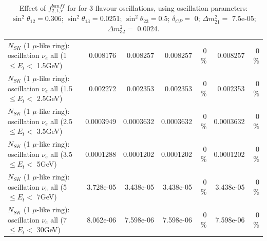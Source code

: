 \begin{table}
\begin{tabular}{| l | r | r | r  r | r  r |}
$N_{SK}$ (1 $\mu$-like ring): oscillation $\nu_{e}$ all (1 $\leq E_{t} <$ 1.5GeV) &        0.008176 &        0.008257 &        0.008257 &        0 \%  &        0.008257 &        0 \%  \\ 
$N_{SK}$ (1 $\mu$-like ring): oscillation $\nu_{e}$ all (1.5 $\leq E_{t} <$ 2.5GeV) &        0.002272 &        0.002353 &        0.002353 &        0 \%  &        0.002353 &        0 \%  \\ 
$N_{SK}$ (1 $\mu$-like ring): oscillation $\nu_{e}$ all (2.5 $\leq E_{t} <$ 3.5GeV) &       0.0003949 &       0.0003632 &       0.0003632 &        0 \%  &       0.0003632 &        0 \%  \\ 
$N_{SK}$ (1 $\mu$-like ring): oscillation $\nu_{e}$ all (3.5 $\leq E_{t} <$ 5GeV) &       0.0001288 &       0.0001202 &       0.0001202 &        0 \%  &       0.0001202 &        0 \%  \\ 
 $N_{SK}$ (1 $\mu$-like ring): oscillation $\nu_{e}$ all (5 $\leq E_{t} <$ 7GeV) &       3.728e-05 &       3.438e-05 &       3.438e-05 &        0 \%  &       3.438e-05 &        0 \%  \\ 
$N_{SK}$ (1 $\mu$-like ring): oscillation $\nu_{e}$ all (7 $\leq E_{t} <$ 30GeV) &       8.062e-06 &       7.598e-06 &       7.598e-06 &        0 \%  &       7.598e-06 &        0 \%  \\ 
\hline
\hline
\end{tabular}
\caption{ Effect of $f_{2; t, r}^{banff}$ for for 3 flavour oscillations, using oscillation parameters:  $\sin^2\theta_{12} = $0.306; $\sin^2\theta_{13} = $0.0251; $\sin^2\theta_{23} = $0.5; $\delta_{CP} = $        0; $\Delta m^2_{21} = $    7.5e-05; $\Delta m^2_{32} = $    0.0024. }
\label{tab:num_banff_02_1RmuT_3f_osc_t13:0.0251}
\end{table}
\clearpage
